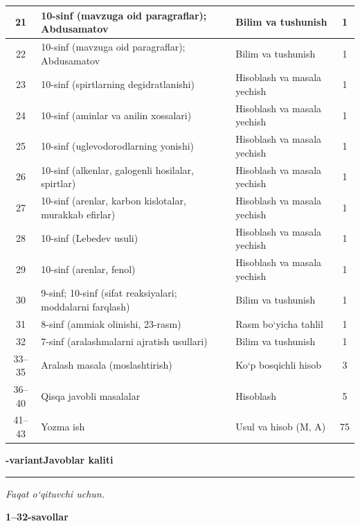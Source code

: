 \documentclass[11pt,a4paper]{article}
\newcommand{\hdrpill}[1]{\begin{tikzpicture}[baseline=0pt]\node[fill=ygreen,text=white,rounded corners=8pt,inner xsep=10pt,inner ysep=5pt,font=\fontsize{13}{15}\bfseries\selectfont] at (0,0.475){#1};\end{tikzpicture}}
\newcommand{\curvar}{}\fancyhead[R]{\hdrpill{\curvar}}
\begin{document}
{\begin{longtable}{|c|p{7.2cm}|p{5.4cm}|c|}
21 & 10-sinf (mavzuga oid paragraflar); Abdusamatov & Bilim va tushunish & 1\\\hline
22 & 10-sinf (mavzuga oid paragraflar); Abdusamatov & Bilim va tushunish & 1\\\hline
23 & 10-sinf (spirtlarning degidratlanishi) & Hisoblash va masala yechish & 1\\\hline
24 & 10-sinf (aminlar va anilin xossalari) & Hisoblash va masala yechish & 1\\\hline
25 & 10-sinf (uglevodorodlarning yonishi) & Hisoblash va masala yechish & 1\\\hline
26 & 10-sinf (alkenlar, galogenli hosilalar, spirtlar) & Hisoblash va masala yechish & 1\\\hline
27 & 10-sinf (arenlar, karbon kislotalar, murakkab efirlar) & Hisoblash va masala yechish & 1\\\hline
28 & 10-sinf (Lebedev usuli) & Hisoblash va masala yechish & 1\\\hline
29 & 10-sinf (arenlar, fenol) & Hisoblash va masala yechish & 1\\\hline
30 & 9-sinf; 10-sinf (sifat reaksiyalari; moddalarni farqlash) & Bilim va tushunish & 1\\\hline
31 & 8-sinf (ammiak olinishi, 23-rasm) & Rasm bo`yicha tahlil & 1\\\hline
32 & 7-sinf (aralashmalarni ajratish usullari) & Bilim va tushunish & 1\\\hline
33--35 & Aralash masala (moslashtirish) & Ko`p bosqichli hisob & 3\\\hline
36--40 & Qisqa javobli masalalar & Hisoblash & 5\\\hline
41--43 & Yozma ish & Usul va hisob (M, A) & 75\\\hline
\end{longtable}}
\renewcommand{\curvar}{Javoblar}
\newpage
\noindent\textbf{\fontsize{13}{15}-variant}\hfill \textbf{Javoblar kaliti}\par\smallskip\hrule\smallskip
\textit{Faqat o`qituvchi uchun.}\par\medskip
\noindent\textbf{1--32-savollar}\par\smallskip
\end{document}
